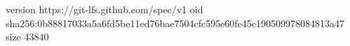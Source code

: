 version https://git-lfs.github.com/spec/v1
oid sha256:0b88817033a5a6fd5be11ed76bae7504cfc595e60fe45c190509978084813a47
size 43840
